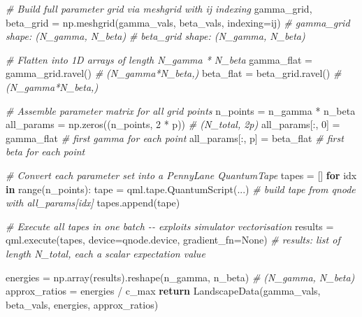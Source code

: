 \documentclass[
  11pt,
]{report}
\newenvironment{Shaded}{}{}
\newcommand{\BuiltInTok}[1]{\textcolor[rgb]{0.00,0.50,0.00}{#1}}
\newcommand{\CommentTok}[1]{\textcolor[rgb]{0.38,0.63,0.69}{\textit{#1}}}
\newcommand{\ControlFlowTok}[1]{\textcolor[rgb]{0.00,0.44,0.13}{\textbf{#1}}}
\newcommand{\DecValTok}[1]{\textcolor[rgb]{0.25,0.63,0.44}{#1}}
\newcommand{\KeywordTok}[1]{\textcolor[rgb]{0.00,0.44,0.13}{\textbf{#1}}}
\newcommand{\NormalTok}[1]{#1}
\newcommand{\OperatorTok}[1]{\textcolor[rgb]{0.40,0.40,0.40}{#1}}
\newcommand{\StringTok}[1]{\textcolor[rgb]{0.25,0.44,0.63}{#1}}
\newcommand{\VariableTok}[1]{\textcolor[rgb]{0.10,0.09,0.49}{#1}}
\begin{document}
\begin{Shaded}
\begin{Highlighting}[]
    \CommentTok{\# Build full parameter grid via meshgrid with \textquotesingle{}ij\textquotesingle{} indexing}
\NormalTok{    gamma\_grid, beta\_grid }\OperatorTok{=}\NormalTok{ np.meshgrid(gamma\_vals, beta\_vals, indexing}\OperatorTok{=}\StringTok{\textquotesingle{}ij\textquotesingle{}}\NormalTok{)}
    \CommentTok{\# gamma\_grid shape: (N\_gamma, N\_beta)}
    \CommentTok{\# beta\_grid  shape: (N\_gamma, N\_beta)}

    \CommentTok{\# Flatten into 1D arrays of length N\_gamma * N\_beta}
\NormalTok{    gamma\_flat }\OperatorTok{=}\NormalTok{ gamma\_grid.ravel()                                     }\CommentTok{\# (N\_gamma*N\_beta,)}
\NormalTok{    beta\_flat }\OperatorTok{=}\NormalTok{ beta\_grid.ravel()                                       }\CommentTok{\# (N\_gamma*N\_beta,)}

    \CommentTok{\# Assemble parameter matrix for all grid points}
\NormalTok{    n\_points }\OperatorTok{=}\NormalTok{ n\_gamma }\OperatorTok{*}\NormalTok{ n\_beta}
\NormalTok{    all\_params }\OperatorTok{=}\NormalTok{ np.zeros((n\_points, }\DecValTok{2} \OperatorTok{*}\NormalTok{ p))                            }\CommentTok{\# (N\_total, 2p)}
\NormalTok{    all\_params[:, }\DecValTok{0}\NormalTok{] }\OperatorTok{=}\NormalTok{ gamma\_flat      }\CommentTok{\# first gamma for each point}
\NormalTok{    all\_params[:, p] }\OperatorTok{=}\NormalTok{ beta\_flat       }\CommentTok{\# first beta for each point}

    \CommentTok{\# Convert each parameter set into a PennyLane QuantumTape}
\NormalTok{    tapes }\OperatorTok{=}\NormalTok{ []}
    \ControlFlowTok{for}\NormalTok{ idx }\KeywordTok{in} \BuiltInTok{range}\NormalTok{(n\_points):}
\NormalTok{        tape }\OperatorTok{=}\NormalTok{ qml.tape.QuantumScript(...)  }\CommentTok{\# build tape from qnode with all\_params[idx]}
\NormalTok{        tapes.append(tape)}

    \CommentTok{\# Execute all tapes in one batch {-}{-} exploits simulator vectorisation}
\NormalTok{    results }\OperatorTok{=}\NormalTok{ qml.execute(tapes, device}\OperatorTok{=}\NormalTok{qnode.device, gradient\_fn}\OperatorTok{=}\VariableTok{None}\NormalTok{)}
    \CommentTok{\# results: list of length N\_total, each a scalar expectation value}

\NormalTok{    energies }\OperatorTok{=}\NormalTok{ np.array(results).reshape(n\_gamma, n\_beta)               }\CommentTok{\# (N\_gamma, N\_beta)}
\NormalTok{    approx\_ratios }\OperatorTok{=}\NormalTok{ energies }\OperatorTok{/}\NormalTok{ c\_max}
    \ControlFlowTok{return}\NormalTok{ LandscapeData(gamma\_vals, beta\_vals, energies, approx\_ratios)}
\end{Highlighting}
\end{Shaded}
\end{document}
